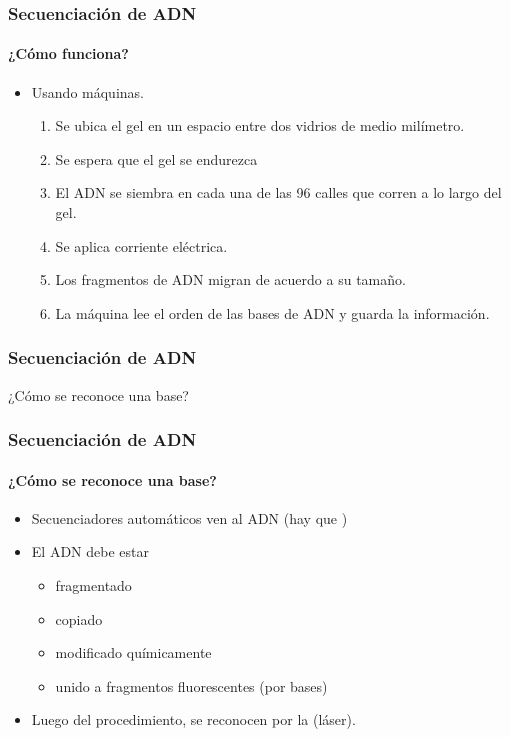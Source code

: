 \frame
{
\frametitle{Secuenciación de ADN}
\framesubtitle{¿Cómo funciona?}
\begin{itemize}
	\item Usando máquinas. 
	\begin{enumerate}
		\item<1-> Se ubica el gel en un espacio entre dos vidrios de medio milímetro.
		\item<2-> Se espera que el gel se endurezca
		\item<3-> El ADN se siembra en cada una de las 96 calles que corren a lo largo del gel.
		\item<4-> Se aplica corriente eléctrica.
		\item<5-> Los fragmentos de ADN migran de acuerdo a su tamaño.
		\item<6-> La máquina lee el orden de las bases de ADN y guarda la información. 
	\end{enumerate}
\end{itemize}
}


\frame
{
\frametitle{Secuenciación de ADN}
\begin{center}
	\huge{¿Cómo se reconoce una base?}
\end{center}
}

\frame
{
\frametitle{Secuenciación de ADN}
\framesubtitle{¿Cómo se reconoce una base?}
\begin{itemize}
	\item Secuenciadores automáticos  ven al ADN (hay que )
	\item El ADN debe estar
	\begin{itemize}
		\item fragmentado
		\item copiado
		\item modificado químicamente
		\item unido a fragmentos fluorescentes (por bases)
	\end{itemize}
	\item Luego del procedimiento, se reconocen por la  (láser).
\end{itemize}
}

